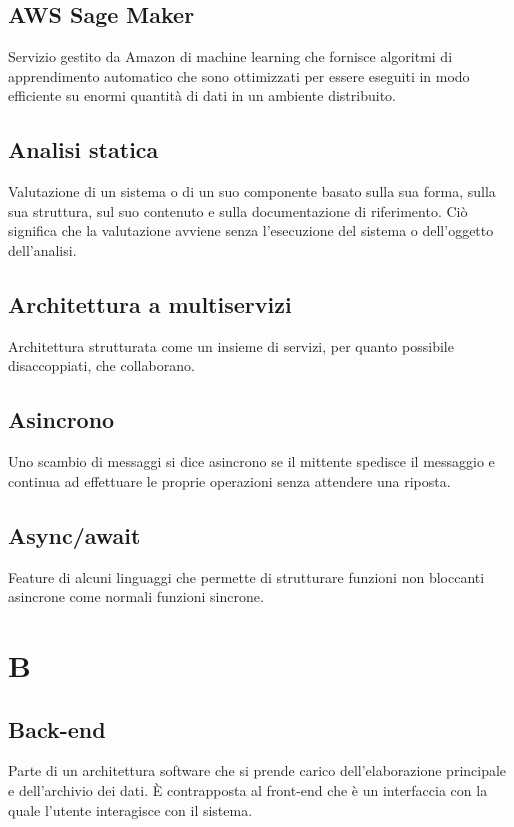 \subsection*{AWS Sage Maker}
Servizio gestito da Amazon di machine learning che fornisce algoritmi di apprendimento automatico che sono ottimizzati per essere eseguiti in modo efficiente su enormi quantità di dati in un ambiente distribuito. 

\subsection*{Analisi statica}
Valutazione di un sistema o di un suo componente basato sulla sua forma, sulla sua struttura, sul suo contenuto e sulla documentazione di riferimento. Ciò significa che la valutazione avviene senza l'esecuzione del sistema o dell'oggetto dell'analisi.

\subsection*{Architettura a multiservizi}
Architettura strutturata come un insieme di servizi, per quanto possibile disaccoppiati, che collaborano.

\subsection*{Asincrono}
Uno scambio di messaggi si dice asincrono se il mittente spedisce il messaggio e continua ad effettuare le proprie operazioni senza attendere una riposta.

\subsection*{Async/await}
Feature di alcuni linguaggi che permette di strutturare funzioni non bloccanti asincrone come normali funzioni sincrone.


\section*{B}

\subsection*{Back-end}
Parte di un architettura software che si prende carico dell'elaborazione principale e dell'archivio dei dati. È contrapposta al front-end che è un interfaccia con la quale l'utente interagisce con il sistema.

